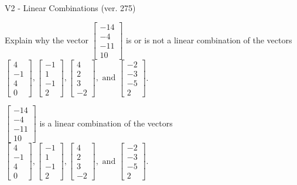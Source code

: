 \begin{exercise}
  \begin{exerciseTitle}V2 - Linear Combinations (ver. 275)\end{exerciseTitle}
  \begin{exerciseStatement}
    Explain why the vector \(\left[\begin{array}{c}
-14 \\
-4 \\
-11 \\
10
\end{array}\right]\)  is or is not a linear 
	combination of the vectors \(\left[\begin{array}{c}
4 \\
-1 \\
4 \\
0
\end{array}\right] , \left[\begin{array}{c}
-1 \\
1 \\
-1 \\
2
\end{array}\right] , \left[\begin{array}{c}
4 \\
2 \\
3 \\
-2
\end{array}\right] , \text{ and } \left[\begin{array}{c}
-2 \\
-3 \\
-5 \\
2
\end{array}\right]\).
	


  \end{exerciseStatement}
  \begin{exerciseAnswer}
   \(\left[\begin{array}{c}
-14 \\
-4 \\
-11 \\
10
\end{array}\right]\) 
  	 is  
	a linear combination of the vectors \(\left[\begin{array}{c}
4 \\
-1 \\
4 \\
0
\end{array}\right] , \left[\begin{array}{c}
-1 \\
1 \\
-1 \\
2
\end{array}\right] , \left[\begin{array}{c}
4 \\
2 \\
3 \\
-2
\end{array}\right] , \text{ and } \left[\begin{array}{c}
-2 \\
-3 \\
-5 \\
2
\end{array}\right]\).


\end{exerciseAnswer}
\end{exercise}
